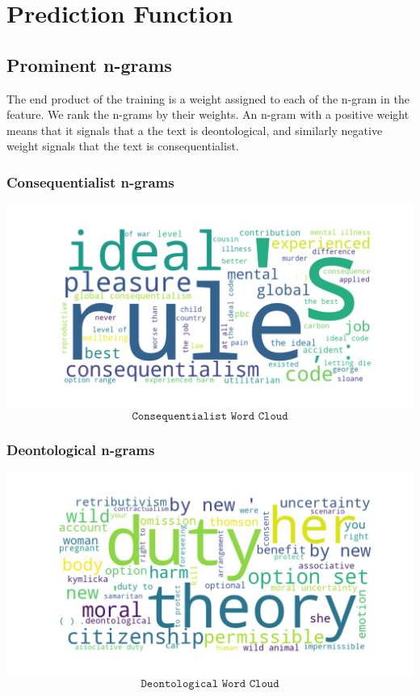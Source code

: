 \documentclass{article}
\begin{document}
\section{Prediction Function}

\subsection{Prominent n-grams}

The end product of the training is a weight assigned to each of the n-gram in the feature. We rank the n-grams by their weights. An n-gram with a positive weight means that it signals that a the text is deontological, and similarly negative weight signals that the text is consequentialist.

\subsubsection{Consequentialist n-grams}
\begin{center}
\includegraphics[width = 16cm] {cons_cloud.png}
    \[\texttt{Consequentialist Word Cloud}\]
\end{center}

\subsubsection{Deontological n-grams}
\begin{center}
\includegraphics[width = 16cm]{deon_cloud.png}
    \[\texttt{Deontological Word Cloud}\]
\end{center}
\end{document}
